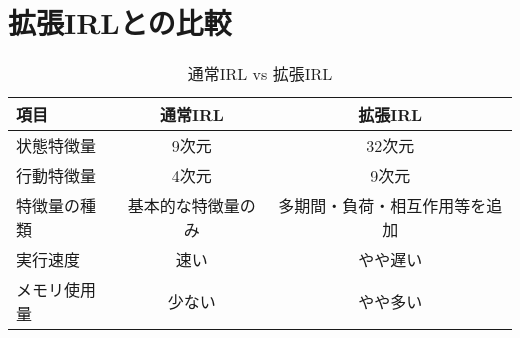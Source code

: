 \documentclass{article}
\begin{document}
\section{拡張IRLとの比較}

\begin{table}[h]
\centering
\caption{通常IRL vs 拡張IRL}
\begin{tabular}{@{}lcc@{}}
\toprule
\textbf{項目} & \textbf{通常IRL} & \textbf{拡張IRL} \\
\midrule
状態特徴量 & 9次元 & 32次元 \\
行動特徴量 & 4次元 & 9次元 \\
特徴量の種類 & 基本的な特徴量のみ & 多期間・負荷・相互作用等を追加 \\
実行速度 & 速い & やや遅い \\
メモリ使用量 & 少ない & やや多い \\
\bottomrule
\end{tabular}
\end{table}
\end{document}

